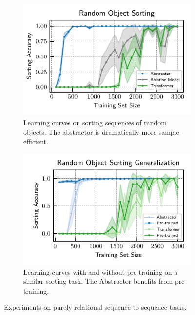 \begin{figure}[ht]
    \centering
    \begin{subfigure}[t]{0.45\textwidth}
        \centering
        \vskip-7.5pt
        \includegraphics[width=\textwidth]{figures/experiments/random_object_sorting.pdf}
        \vskip-7.5pt
        \caption{Learning curves on sorting sequences of random objects. The abstractor is dramatically more sample-efficient.}\label{fig:exp_object_sorting}
    \end{subfigure}\hspace{\fill}
    \begin{subfigure}[t]{0.45\textwidth}
        \centering
        \vskip-7.5pt
        \includegraphics[width=\textwidth]{figures/experiments/random_object_sorting_generalization.pdf}
        \vskip-7.5pt
        \caption{Learning curves with and without pre-training on a similar sorting task. The Abstractor benefits from pre-training.}\label{fig:exp_object_sorting_generalization}
    \end{subfigure}
    \caption{Experiments on purely relational sequence-to-sequence tasks.}\label{fig:experiments}
    \vskip-15pt
\end{figure}


